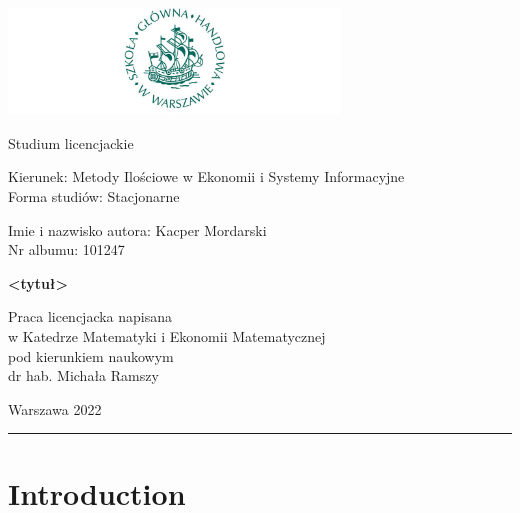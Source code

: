 \documentclass[english, twoside, 12pt, a4paper]{article}
\theoremstyle{definition}
\theoremstyle{plain}
\theoremstyle{remark}
\begin{document}
\begin{titlepage}
\centering

\includegraphics[width=0.66\textwidth]{logo.JPG}

\vspace*{0.5cm}
Studium licencjackie\\
\begin{flushleft}
Kierunek: Metody Ilościowe w Ekonomii i Systemy Informacyjne\\
Forma studiów: Stacjonarne
\end{flushleft}

\vspace*{.5cm}
\rule{0cm}{1cm}\hfill
\begin{minipage}{9cm}
Imie i nazwisko autora: Kacper Mordarski\\
Nr albumu: 101247
\end{minipage}

\vspace*{1cm}
\begin{minipage}{12cm}
\centering
\Large
\textbf{<tytuł>}
\end{minipage}

\vspace*{2cm}
\rule{0cm}{1cm}\hfill
\begin{minipage}{9cm}
Praca licencjacka napisana\\
w Katedrze Matematyki i Ekonomii Matematycznej\\
pod kierunkiem naukowym\\
dr hab. Michała Ramszy
\end{minipage}

\vfill
Warszawa 2022
\end{titlepage}

\rule{1ex}{0ex}\clearpage

\cleardoublepage
\tableofcontents

\cleardoublepage
\section{Introduction}
\end{document}
